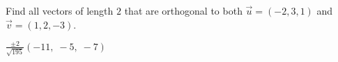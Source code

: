 
\begin{Exercise}[
name={},
title={}, 
difficulty=0,
origin={\cite{YL}}]
Find all vectors of length $2$ that are orthogonal to both $\vec{u}=(-2, 3, 1)$ and $\vec{v}=(1, 2, -3)$.
\end{Exercise}

\begin{Answer}
$\frac{\pm 2}{\sqrt{195}}(-11,\;-5,\;-7)$
\end{Answer}
